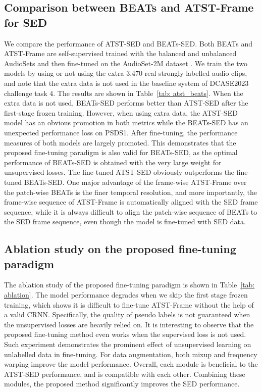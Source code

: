 \documentclass{article}
\begin{document}
\subsection{Comparison between BEATs and ATST-Frame for SED}
We compare the performance of ATST-SED and BEATs-SED. Both BEATs and ATST-Frame are self-supervised trained with the balanced and unbalanced AudioSets \cite{gemmeke2017audio} and then fine-tuned on the AudioSet-2M dataset \cite{gemmeke2017audio}. 
We train the two models by using or not using the extra 3,470 real strongly-labelled audio clips, and note that the extra data is not used in the baseline system of DCASE2023 challenge task 4. The results are shown in Table~\ref{tab: atst_beats}. When the extra data is not used, BEATs-SED performs better than ATST-SED after the first-stage frozen training. However, when using extra data, the ATST-SED model has an obvious promotion in both metrics while the BEATs-SED has an unexpected performance loss on PSDS1. 
After fine-tuning, the performance measures of both models are largely promoted. This demonstrates that the proposed fine-tuning paradigm is also valid for BEATs-SED, as the optimal performance of BEATs-SED is obtained with the very large weight for unsupervised losses. The fine-tuned ATST-SED obviously outperforms the fine-tuned BEATs-SED. One major advantage of the frame-wise ATST-Frame over the patch-wise BEATs is the finer temporal resolution, and more importantly, the frame-wise sequence of ATST-Frame is automatically aligned with the SED frame sequence, while it is always difficult to align the patch-wise sequence of BEATs to the SED frame sequence, even though the model is fine-tuned with SED data. 

\subsection{Ablation study on the proposed fine-tuning paradigm}
The ablation study of the proposed fine-tuning paradigm is shown in Table~\ref{tab: ablation}. The model performance degrades when we skip the first stage frozen training, which shows it is difficult to fine-tune ATST-Frame without the help of a valid CRNN. Specifically, the quality of pseudo labels is not guaranteed when the unsupervised losses are heavily relied on. It is interesting to observe that the proposed fine-tuning method even works when the supervised loss is not used. Such experiment demonstrates the prominent effect of unsupervised learning on unlabelled data in fine-tuning. For data augmentation, both mixup and frequency warping improve the model performance. Overall, each module is beneficial to the ATST-SED performance, and is compatible with each other. Combining these modules, the proposed method significantly improves the SED performance. 
\end{document}
